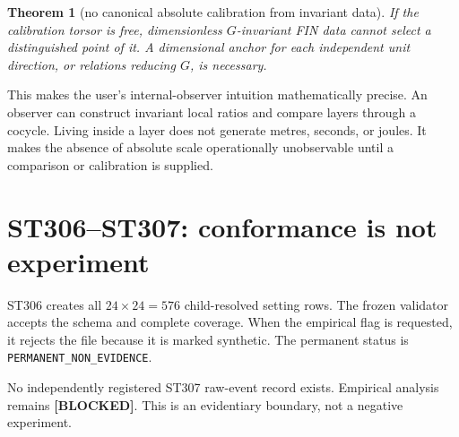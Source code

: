 \documentclass[11pt,a4paper]{article}
\newcommand{\Blocked}{\textcolor{blocked}{\textbf{[BLOCKED]}}}
\newtheorem{theorem}{Theorem}[section]
\begin{document}
\begin{theorem}[no canonical absolute calibration from invariant data]
If the calibration torsor is free, dimensionless $G$-invariant FIN data cannot select a
distinguished point of it. A dimensional anchor for each independent unit direction, or
relations reducing $G$, is necessary.
\end{theorem}

This makes the user's internal-observer intuition mathematically precise. An observer can
construct invariant local ratios and compare layers through a cocycle. Living inside a
layer does not generate metres, seconds, or joules. It makes the absence of absolute scale
operationally unobservable until a comparison or calibration is supplied.

\section{ST306--ST307: conformance is not experiment}

ST306 creates all $24\times24=576$ child-resolved setting rows. The frozen validator accepts
the schema and complete coverage. When the empirical flag is requested, it rejects the file
because it is marked synthetic. The permanent status is
\texttt{PERMANENT\_NON\_EVIDENCE}.

No independently registered ST307 raw-event record exists. Empirical analysis remains
\Blocked. This is an evidentiary boundary, not a negative experiment.
\end{document}
